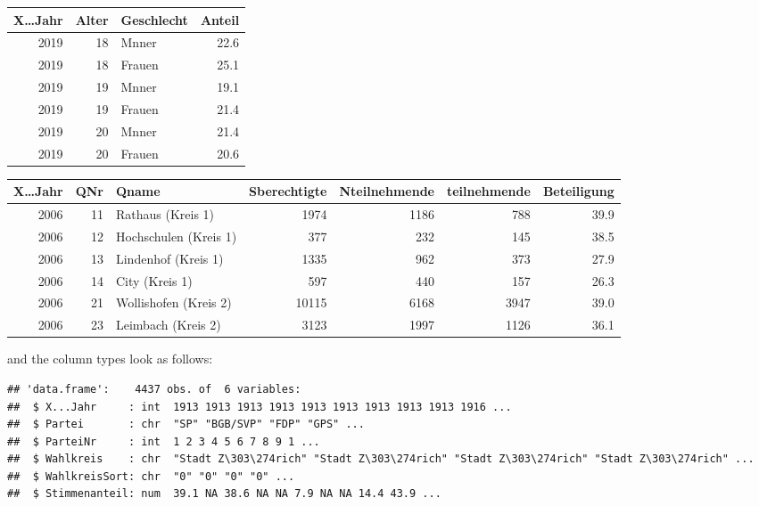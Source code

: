 \documentclass[
]{article}
\begin{document}
\begin{longtable}[]{@{}rrlr@{}}
\toprule
X\ldots Jahr & Alter & Geschlecht & Anteil\tabularnewline
\midrule
\endhead
2019 & 18 & Mnner & 22.6\tabularnewline
2019 & 18 & Frauen & 25.1\tabularnewline
2019 & 19 & Mnner & 19.1\tabularnewline
2019 & 19 & Frauen & 21.4\tabularnewline
2019 & 20 & Mnner & 21.4\tabularnewline
2019 & 20 & Frauen & 20.6\tabularnewline
\bottomrule
\end{longtable}

\begin{longtable}[]{@{}rrlrrrr@{}}
\toprule
X\ldots Jahr & QNr & Qname & Sberechtigte & Nteilnehmende & teilnehmende
& Beteiligung\tabularnewline
\midrule
\endhead
2006 & 11 & Rathaus (Kreis 1) & 1974 & 1186 & 788 & 39.9\tabularnewline
2006 & 12 & Hochschulen (Kreis 1) & 377 & 232 & 145 &
38.5\tabularnewline
2006 & 13 & Lindenhof (Kreis 1) & 1335 & 962 & 373 & 27.9\tabularnewline
2006 & 14 & City (Kreis 1) & 597 & 440 & 157 & 26.3\tabularnewline
2006 & 21 & Wollishofen (Kreis 2) & 10115 & 6168 & 3947 &
39.0\tabularnewline
2006 & 23 & Leimbach (Kreis 2) & 3123 & 1997 & 1126 &
36.1\tabularnewline
\bottomrule
\end{longtable}

and the column types look as follows:

\begin{verbatim}
## 'data.frame':    4437 obs. of  6 variables:
##  $ X...Jahr     : int  1913 1913 1913 1913 1913 1913 1913 1913 1913 1916 ...
##  $ Partei       : chr  "SP" "BGB/SVP" "FDP" "GPS" ...
##  $ ParteiNr     : int  1 2 3 4 5 6 7 8 9 1 ...
##  $ Wahlkreis    : chr  "Stadt Z\303\274rich" "Stadt Z\303\274rich" "Stadt Z\303\274rich" "Stadt Z\303\274rich" ...
##  $ WahlkreisSort: chr  "0" "0" "0" "0" ...
##  $ Stimmenanteil: num  39.1 NA 38.6 NA NA 7.9 NA NA 14.4 43.9 ...
\end{verbatim}
\end{document}
